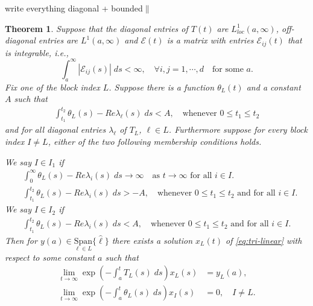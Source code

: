 \documentclass[a4paper,11pt]{article}
\def\red{\color{red}}
\newtheorem{theorem}{Theorem}
\theoremstyle{remark}
\begin{document}
{\red write everything diagonal + bounded$\Big\|$}

\begin{theorem}
Suppose that the diagonal entries of $T(t)$ are $L^1_{loc}(a,\infty)$, off-diagonal entries are $L^1(a,\infty)$ and $\mathcal{E}(t)$ is a matrix with entries $\mathcal{E}_{ij}(t)$ that is integrable, i.e.,
 $$ \int_a^\infty |\mathcal{E}_{ij}(s)| \; ds < \infty, \quad \forall i,j=1,\cdots,d \quad \text{for some $a$.}$$
Fix one of the block index $L$. Suppose there is a function $\theta_L(t)$ and a constant $A$ such that
\begin{align} \label{eq:Lcond}
  \int_{t_1}^{t_2} \theta_L(s) - Re\lambda_\ell(s) \; ds <  A, \quad \text{whenever $0\le t_1\le t_2$}
\end{align}
and for all diagonal entries $\lambda_\ell$ of $T_L$, $\ell\in L$.
Furthermore suppose for every block index $I\ne L$, either of the two following membership conditions holds.

We say $I\in I_1$ if
\begin{equation}\label{eq:I1cond}
\begin{aligned}
 &\int_0^\infty \theta_L(s) - Re\lambda_i(s) \; ds \rightarrow \infty \quad \text{as $t \rightarrow \infty$ for all $i\in I$.}\\
 &\int_{t_1}^{t_2} \theta_L(s) - Re\lambda_i(s) \; ds > - A, \quad \text{whenever $0\le t_1\le t_2$ and for all $i\in I$.}
\end{aligned}
\end{equation}
We say $I\in I_2$ if
\begin{align} \label{eq:I2cond}
 \int_{t_1}^{t_2} \theta_L(s) - Re\lambda_i(s) \; ds <  A, \quad \text{whenever $0\le t_1\le t_2$ and for all $i\in I$.}
\end{align}
Then for $y(a)\in \underset{\ell\in L}{ \textrm{Span}}\{\hat{\ell}\}$ there exists a solution $x_L(t)$ of \eqref{eq:tri-linear} with respect to some constant $a$ such that
\begin{align}
 \lim_{t \rightarrow\infty} \exp\left(-\int_a^t T_L(s)\; ds\right) x_L(s) &= y_L(a),\\
 \lim_{t \rightarrow\infty} \exp\left(-\int_a^t \theta_L(s)\; ds\right) x_I(s) &= 0, \quad I\ne L.
\end{align}
\end{theorem}
\end{document}
